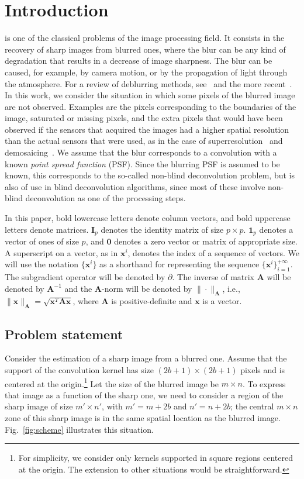 \documentclass[10pt,twocolumn,twoside]{IEEEtran}
\newcommand{\x}{\mathbf{x}} %
\newcommand{\A}{\mathbf{A}} %
\newcommand{\I}{\mathbf{I}} %
\begin{document}
\section{Introduction}
\label{sec:introduction}
 is one of the classical problems of the image processing field. It consists in the recovery of sharp images from blurred ones, where the blur can be any kind of degradation that results in a decrease of image sharpness. The blur can be caused, for example, by camera motion, or by the propagation of light through the atmosphere. For a review of deblurring methods, see~\cite{campisi2007} and the more recent~\cite{Rajagopalan2014}. In this work, we consider the situation in which some pixels of the blurred image are not observed. Examples are the pixels corresponding to the boundaries of the image, saturated or missing pixels, and the extra pixels that would have been observed if the sensors that acquired the images had a higher spatial resolution than the actual sensors that were used, as in the case of superresolution~\cite{Milanfar2010} and demosaicing~\cite{Lukac2008}. We assume that the blur corresponds to a convolution with a known \emph{point spread function} (PSF). Since the blurring PSF is assumed to be known, this corresponds to the so-called non-blind deconvolution problem, but is also of use in blind deconvolution algorithms, since most of these involve non-blind deconvolution as one of the processing steps.

In this paper, bold lowercase letters denote column vectors, and bold uppercase letters denote matrices. $\I_p$ denotes the identity matrix of size $p \times p$. $\mathbf 1_p$ denotes a vector of ones of size $p$, and $\mathbf 0$ denotes a zero vector or matrix of appropriate size. A superscript on a vector, as in $\x^i$, denotes the index of a sequence of vectors. We will use the notation $\{\x^i\}$ as a shorthand for representing the sequence $\{\x^i\}_{i=1}^{+\infty}$. The subgradient operator will be denoted by $\partial$. The inverse of matrix $\A$ will be denoted by $\A^{-1}$ and the $\A$-norm will be denoted by $\| \cdot \|_{\A}$, i.e., $\|\x\|_{\A} = \sqrt{\x^T \A \x}$, where $\A$ is positive-definite and $\x$ is a vector.


\subsection{Problem statement}
\label{sec:problemstatement}

Consider the estimation of a sharp image from a blurred one. Assume that the support of the convolution kernel has size $(2b+1) \times (2b+1)$ pixels and is centered at the origin.\footnote{For simplicity, we consider only kernels supported in square regions centered at the origin. The extension to other situations would be straightforward.} Let the size of the blurred image be $m \times n$. To express that image as a function of the sharp one, we need to consider a region of the sharp image of size $m' \times n'$, with $m'=m+2b$ and $n'=n+2b$; the central $m \times n$ zone of this sharp image is in the same spatial location as the blurred image. Fig.~\ref{fig:scheme} illustrates this situation.
\end{document}
